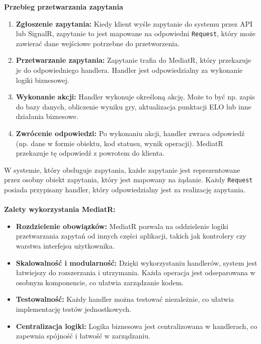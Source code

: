 \documentclass[12pt,a4paper]{article}
\begin{document}
\textbf{Przebieg przetwarzania zapytania}
\begin{enumerate}
    \item \textbf{Zgłoszenie zapytania:} Kiedy klient wyśle zapytanie do systemu przez API lub SignalR, zapytanie to jest mapowane na odpowiedni \texttt{Request}, który może zawierać dane wejściowe potrzebne do przetworzenia.
    \item \textbf{Przetwarzanie zapytania:} Zapytanie trafia do MediatR, który przekazuje je do odpowiedniego handlera. Handler jest odpowiedzialny za wykonanie logiki biznesowej.
    \item \textbf{Wykonanie akcji:} Handler wykonuje określoną akcję. Może to być np. zapis do bazy danych, obliczenie wyniku gry, aktualizacja punktacji ELO lub inne działania biznesowe.
    \item \textbf{Zwrócenie odpowiedzi:} Po wykonaniu akcji, handler zwraca odpowiedź (np. dane w formie obiektu, kod statusu, wynik operacji). MediatR przekazuje tę odpowiedź z powrotem do klienta.
\end{enumerate}

\noindent
W systemie, który obsługuje zapytania, każde zapytanie jest reprezentowane przez osobny obiekt zapytania, który jest mapowany na żądanie. Każdy \texttt{Request} posiada przypisany handler, który odpowiedzialny jest za realizację zapytania.
\\\\

\textbf{Zalety wykorzystania MediatR:}
\begin{itemize}
    \item \textbf{Rozdzielenie obowiązków:} MediatR pozwala na oddzielenie logiki przetwarzania zapytań od innych części aplikacji, takich jak kontrolery czy warstwa interfejsu użytkownika.
    \item \textbf{Skalowalność i modularność:} Dzięki wykorzystaniu handlerów, system jest łatwiejszy do rozszerzania i utrzymania. Każda operacja jest odseparowana w osobnym komponencie, co ułatwia zarządzanie kodem.
    \item \textbf{Testowalność:} Każdy handler można testować niezależnie, co ułatwia implementację testów jednostkowych.
    \item \textbf{Centralizacja logiki:} Logika biznesowa jest centralizowana w handlerach, co zapewnia spójność i łatwość w zarządzaniu.
\end{itemize}

\newpage
\end{document}
